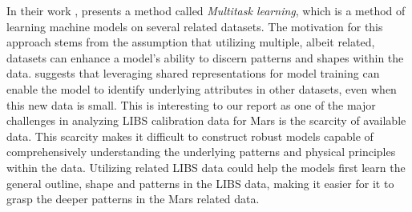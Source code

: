 In their work \citet{caruana_no_1997}, presents a method called \textit{Multitask learning}, which is a method of learning machine models on several related datasets. 
The motivation for this approach stems from the assumption that utilizing multiple, albeit related, datasets can enhance a model's ability to discern patterns and shapes within the data.
\citet{caruana_no_1997} suggests that leveraging shared representations for model training can enable the model to identify underlying attributes in other datasets, even when this new data is small.
This is interesting to our report as one of the major challenges in analyzing LIBS calibration data for Mars is the scarcity of available data.
This scarcity makes it difficult to construct robust models capable of comprehensively understanding the underlying patterns and physical principles within the data.
Utilizing related LIBS data could help the models first learn the general outline, shape and patterns in the LIBS data, making it easier for it to grasp the deeper patterns in the Mars related data.



